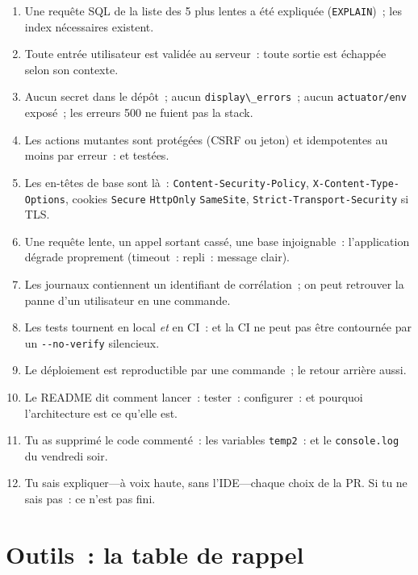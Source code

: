 \begin{enumerate}
  \item[] Une requ\^ete SQL de la liste des 5 plus lentes a \'et\'e expliqu\'ee (\verb|EXPLAIN|)~; les index n\'ecessaires existent.
  \item[] Toute entr\'ee utilisateur est valid\'ee au serveur~: toute sortie est \'echapp\'ee selon son contexte.
  \item[] Aucun secret dans le d\'ep\^ot~; aucun \verb|display\_errors|~; aucun \verb|actuator/env| expos\'e~; les erreurs 500 ne fuient pas la stack.
  \item[] Les actions mutantes sont prot\'eg\'ees (CSRF ou jeton) et idempotentes au moins par erreur~: et test\'ees.
  \item[] Les en-t\^etes de base sont l\`a~: \verb|Content-Security-Policy|, \verb|X-Content-Type-Options|, cookies \verb|Secure| \verb|HttpOnly| \verb|SameSite|, \verb|Strict-Transport-Security| si TLS.
  \item[] Une requ\^ete lente, un appel sortant cass\'e, une base injoignable~: l'application d\'egrade proprement (timeout~: repli~: message clair).
  \item[] Les journaux contiennent un identifiant de corr\'elation~; on peut retrouver la panne d'un utilisateur en une commande.
  \item[] Les tests tournent en local \emph{et} en CI~: et la CI ne peut pas \^etre contourn\'ee par un \verb|--no-verify| silencieux.
  \item[] Le d\'eploiement est reproductible par une commande~; le retour arri\`ere aussi.
  \item[] Le README dit comment lancer~: tester~: configurer~: et pourquoi l'architecture est ce qu'elle est.
  \item[] Tu as supprim\'e le code comment\'e~: les variables \verb|temp2|~: et le \verb|console.log| du vendredi soir.
  \item[] Tu sais expliquer---\`a voix haute, sans l'IDE---chaque choix de la PR. Si tu ne sais pas~: ce n'est pas fini.
\end{enumerate}

\section{Outils~: la table de rappel}

